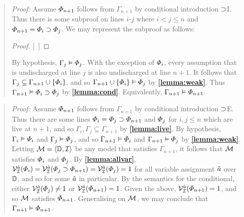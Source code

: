 \begin{quote} 
  \textit{Proof:} Assume $\varPhi_{n+1}$ follows from $\Gamma_{n+1}$ by conditional introduction $\supset$I.
  Thus there is some subproof on lines $i$-$j$ where $i<j\leq n$ and $\varPhi_{n+1}=\varPhi_i \supset \varPhi_j$.
  We may represent the subproof as follows:

  \begin{proof}
  \open
    \metaA {}
  \close
  [\ ]{\metaA\eif\metaB} %
  \end{proof}

  By hypothesis, $\Gamma_j \vDash \varPhi_j$.
  With the exception of $\varPhi_i$, every assumption that is undischarged at line $j$ is also undischarged at line $n+1$.
  It follows that $\Gamma_j\subseteq\Gamma_{n+1}\cup\lbrace\varPhi_i\rbrace$, and so $\Gamma_{n+1}\cup\lbrace\varPhi_i\rbrace \vDash \varPhi_j$ by \textbf{\ref{lemma:weak}}.
  Thus $\Gamma_{n+1} \vDash \varPhi_i \supset \varPhi_j$ by \textbf{\ref{lemma:cond}}.
  Equivalently, $\Gamma_{n+1} \vDash \varPhi_{n+1}$.
\end{quote}





\label{rule:CondE}

\begin{quote} 
  \textit{Proof:} Assume $\varPhi_{n+1}$ follows from $\Gamma_{n+1}$ by conditional introduction $\supset$E.
  Thus there are some lines $\varPhi_i=\varPhi_j\supset\varPhi_{n+1}$ and $\varPhi_j$ for $i,j\leq n$ which are live at $n+1$, and so $\Gamma_i,\Gamma_j\subseteq\Gamma_{n+1}$ by \textbf{\ref{lemma:live}}.
  By hypothesis, $\Gamma_i\vDash \varPhi_i$ and $\Gamma_j\vDash \varPhi_j$, and so $\Gamma_{n+1} \vDash \varPhi_i$ and $\Gamma_{n+1} \vDash \varPhi_j$ by \textbf{\ref{lemma:weak}}.
  Letting $\mathcal{M}=\langle\mathbb{D},\mathcal{I}\rangle$ be any model that satisfies $\Gamma_{n+1}$, it follows that $\mathcal{M}$ satisfies $\varPhi_i$ and $\varPhi_j$.
  By \textbf{\ref{lemma:allvar}}, $\mathcal{V}_{\mathcal{I}}^{\hat{a}}(\varPhi_i)=\mathcal{V}_{\mathcal{I}}^{\hat{a}}(\varPhi_j\supset\varPhi_{n+1})=\mathcal{V}_{\mathcal{I}}^{\hat{a}}(\varPhi_j)=1$ for all variable assignment $\hat{a}$ over $\mathbb{D}$, and so for some $\hat{a}$ in particular.
  By the semantics for the conditional, either $\mathcal{V}_{\mathcal{I}}^{\hat{a}}(\varPhi_j)\neq 1$ or $\mathcal{V}_{\mathcal{I}}^{\hat{a}}(\varPhi_{n+1})=1$.
  Given the above, $\mathcal{V}_{\mathcal{I}}^{\hat{a}}(\varPhi_{n+1})=1$, and so $\mathcal{M}$ satisfies $\varPhi_{n+1}$.
  Generalising on $\mathcal{M}$, we may conclude that $\Gamma_{n+1} \vDash \varPhi_{n+1}$.
\end{quote}






